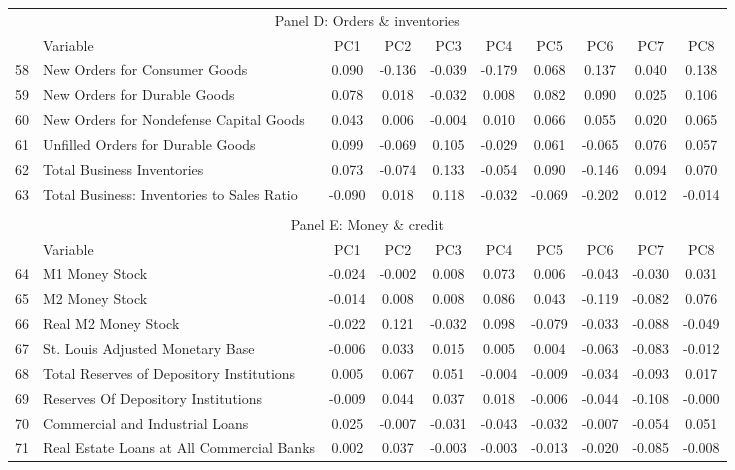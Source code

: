 \begin{table}[!h]
\scriptsize
    \centering
    \begin{tabular}{llcccccccc}
    \hline
 \multicolumn{10}{c}{Panel D: Orders \& inventories} \\ 
&Variable&	PC1	&	PC2	&	PC3	&	PC4	&	PC5	&	PC6	&	PC7	&	PC8	\\ \hline
58&New Orders for Consumer Goods	&	0.090	&	-0.136	&	-0.039	&	-0.179	&	0.068	&	0.137	&	0.040	&	0.138	\\
59&New Orders for Durable Goods	&	0.078	&	0.018	&	-0.032	&	0.008	&	0.082	&	0.090	&	0.025	&	0.106	\\
60&New Orders for Nondefense Capital Goods	&	0.043	&	0.006	&	-0.004	&	0.010	&	0.066	&	0.055	&	0.020	&	0.065	\\
61&Unfilled Orders for Durable Goods	&	0.099	&	-0.069	&	0.105	&	-0.029	&	0.061	&	-0.065	&	0.076	&	0.057	\\
62&Total Business Inventories	&	0.073	&	-0.074	&	0.133	&	-0.054	&	0.090	&	-0.146	&	0.094	&	0.070	\\
63&Total Business: Inventories to Sales Ratio	&	-0.090	&	0.018	&	0.118	&	-0.032	&	-0.069	&	-0.202	&	0.012	&	-0.014	\\
\\ \hline
 \multicolumn{10}{c}{Panel E: Money \& credit} \\ 
&Variable&	PC1	&	PC2	&	PC3	&	PC4	&	PC5	&	PC6	&	PC7	&	PC8	\\ \hline
64&M1 Money Stock	&	-0.024	&	-0.002	&	0.008	&	0.073	&	0.006	&	-0.043	&	-0.030	&	0.031	\\
65&M2 Money Stock	&	-0.014	&	0.008	&	0.008	&	0.086	&	0.043	&	-0.119	&	-0.082	&	0.076	\\
66&Real M2 Money Stock	&	-0.022	&	0.121	&	-0.032	&	0.098	&	-0.079	&	-0.033	&	-0.088	&	-0.049	\\
67&St. Louis Adjusted Monetary Base	&	-0.006	&	0.033	&	0.015	&	0.005	&	0.004	&	-0.063	&	-0.083	&	-0.012	\\
68&Total Reserves of Depository Institutions	&	0.005	&	0.067	&	0.051	&	-0.004	&	-0.009	&	-0.034	&	-0.093	&	0.017	\\
69&Reserves Of Depository Institutions	&	-0.009	&	0.044	&	0.037	&	0.018	&	-0.006	&	-0.044	&	-0.108	&	-0.000	\\
70&Commercial and Industrial Loans	&	0.025	&	-0.007	&	-0.031	&	-0.043	&	-0.032	&	-0.007	&	-0.054	&	0.051	\\
71&Real Estate Loans at All Commercial Banks	&	0.002	&	0.037	&	-0.003	&	-0.003	&	-0.013	&	-0.020	&	-0.085	&	-0.008	\\

\end{tabular}
\end{table}

